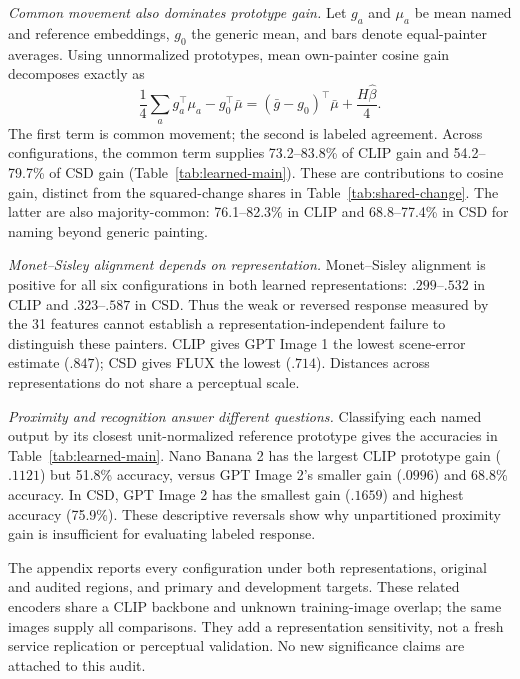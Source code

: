 \emph{Common movement also dominates prototype gain.}
Let $g_a$ and $\mu_a$ be mean named and reference embeddings, $g_0$ the generic
mean, and bars denote equal-painter averages. Using unnormalized prototypes,
mean own-painter cosine gain decomposes exactly as
\begin{equation}
\frac14\sum_a g_a^\top\mu_a-g_0^\top\bar\mu
=(\bar g-g_0)^\top\bar\mu+\frac{H\widehat\beta}{4}.
\label{eq:prototype-main}
\end{equation}
The first term is common movement; the second is labeled agreement.
Across configurations, the common term supplies 73.2--83.8\% of CLIP gain and
54.2--79.7\% of CSD gain (Table~\ref{tab:learned-main}). These are contributions
to cosine gain, distinct from the squared-change shares in
Table~\ref{tab:shared-change}. The latter are also majority-common:
76.1--82.3\% in CLIP and 68.8--77.4\% in CSD for naming beyond generic painting.



\emph{Monet--Sisley alignment depends on representation.}
Monet--Sisley alignment is positive for all six configurations in both learned
representations: $.299$--$.532$ in CLIP and $.323$--$.587$ in CSD. Thus the
weak or reversed response measured by the 31 features cannot establish a
representation-independent failure to distinguish these painters. CLIP gives
GPT Image 1 the lowest scene-error estimate ($.847$); CSD gives FLUX the
lowest ($.714$). Distances across representations do not share a perceptual scale.

\emph{Proximity and recognition answer different questions.}
Classifying each named output by its closest unit-normalized reference prototype
gives the accuracies in Table~\ref{tab:learned-main}. Nano Banana 2 has the largest
CLIP prototype gain ($.1121$) but 51.8\% accuracy, versus GPT Image 2's smaller
gain ($.0996$) and 68.8\% accuracy. In CSD, GPT Image 2 has the smallest gain
($.1659$) and highest accuracy (75.9\%). These descriptive reversals show why
unpartitioned proximity gain is insufficient for evaluating labeled response.

The appendix reports every configuration under both representations, original
and audited regions, and primary and development targets. These related
encoders share a CLIP backbone and unknown training-image overlap; the same
images supply all comparisons. They add a representation sensitivity, not a
fresh service replication or perceptual validation. No new significance claims
are attached to this audit.

